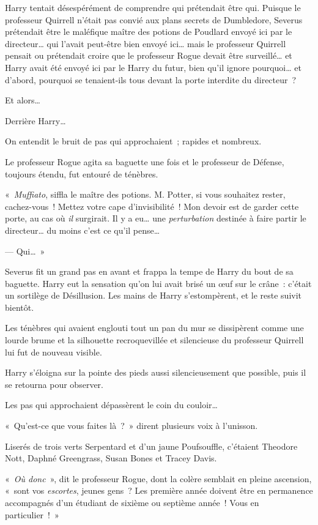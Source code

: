 Harry tentait désespérément de comprendre qui prétendait être qui. Puisque le professeur Quirrell n'était pas convié aux plans secrets de Dumbledore, Severus prétendait être le maléfique maître des potions de Poudlard envoyé ici par le directeur… qui l'avait peut-être bien envoyé ici… mais le professeur Quirrell pensait ou prétendait croire que le professeur Rogue devait être surveillé… et Harry avait été envoyé ici par le Harry du futur, bien qu'il ignore pourquoi… et d'abord, pourquoi se tenaient-ils tous devant la porte interdite du directeur~?

Et alors…

Derrière Harry…

On entendit le bruit de pas qui approchaient~; rapides et nombreux.

Le professeur Rogue agita sa baguette une fois et le professeur de Défense, toujours étendu, fut entouré de ténèbres.

«~\emph{Muffiato}, siffla le maître des potions. M. Potter, si vous souhaitez rester, cachez-vous~! Mettez votre cape d'invisibilité~! Mon devoir est de garder cette porte, au cas où \emph{il} surgirait. Il y a eu… une \emph{perturbation} destinée à faire partir le directeur… du moins c'est ce qu'il pense…

--- Qui…~»

Severus fit un grand pas en avant et frappa la tempe de Harry du bout de sa baguette. Harry eut la sensation qu'on lui avait brisé un œuf sur le crâne~: c'était un sortilège de Désillusion. Les mains de Harry s'estompèrent, et le reste suivit bientôt.

Les ténèbres qui avaient englouti tout un pan du mur se dissipèrent comme une lourde brume et la silhouette recroquevillée et silencieuse du professeur Quirrell lui fut de nouveau visible.

Harry s'éloigna sur la pointe des pieds aussi silencieusement que possible, puis il se retourna pour observer.

Les pas qui approchaient dépassèrent le coin du couloir…

«~Qu'est-ce que vous faites là~?~» dirent plusieurs voix à l'unisson.

Liserés de trois verts Serpentard et d'un jaune Poufsouffle, c'étaient Theodore Nott, Daphné Greengrass, Susan Bones et Tracey Davis.

«~\emph{Où donc}~», dit le professeur Rogue, dont la colère semblait en pleine ascension, «~sont vos \emph{escortes}, jeunes gens~? Les première année doivent être en permanence accompagnés d'un étudiant de sixième ou septième année~! Vous en particulier~!~»

